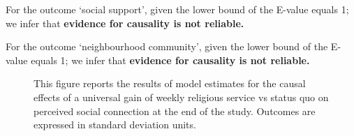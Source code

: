 \documentclass[
  single column]{article}
\begin{document}
For the outcome `social support', given the lower bound of the E-value
equals 1; we infer that \textbf{evidence for causality is not reliable.}

For the outcome `neighbourhood community', given the lower bound of the
E-value equals 1; we infer that \textbf{evidence for causality is not
reliable.}

\newpage{}

\begin{figure}


\caption{\label{fig-2_2}This figure reports the results of model
estimates for the causal effects of a universal gain of weekly religious
service vs status quo on perceived social connection at the end of the
study. Outcomes are expressed in standard deviation units.}

\end{figure}%
\end{document}
